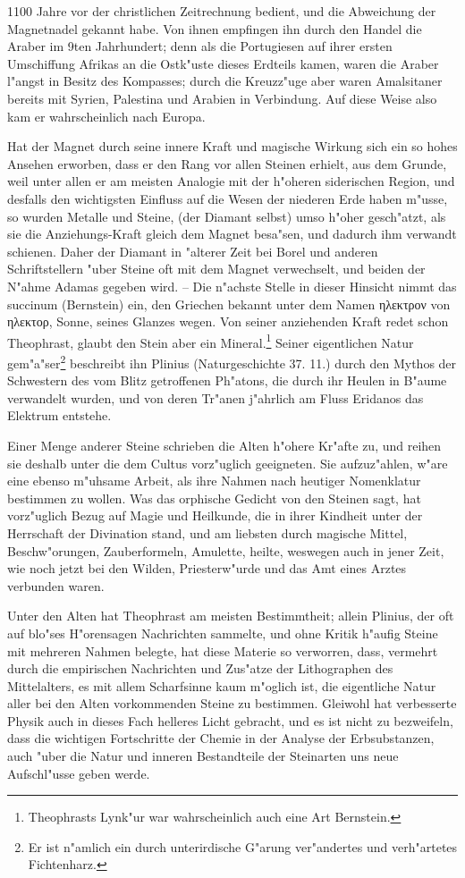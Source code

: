 \documentclass[a4paper, 11pt, oneside, polutonikogreek, german]{article}
\begin{document}
1100 Jahre vor der christlichen Zeitrechnung bedient, und die Abweichung der Magnetnadel gekannt habe. Von ihnen empfingen ihn durch den Handel die Araber im 9ten Jahrhundert; denn als die Portugiesen auf ihrer ersten Umschiffung Afrikas an die Ostk"uste dieses Erdteils kamen, waren die Araber l"angst in Besitz des Kompasses; durch die Kreuzz"uge aber waren Amalsitaner bereits mit Syrien, Palestina und Arabien in Verbindung. Auf diese Weise also kam er wahrscheinlich nach Europa.

Hat der Magnet durch seine innere Kraft und magische Wirkung sich ein so hohes Ansehen erworben, dass er den Rang vor allen Steinen erhielt, aus dem Grunde, weil unter allen er am meisten Analogie mit der h"oheren siderischen Region, und desfalls den wichtigsten Einfluss auf die Wesen der niederen Erde haben m"usse, so wurden Metalle und Steine, (der Diamant selbst) umso h"oher gesch"atzt, als sie die Anziehungs-Kraft gleich dem Magnet besa"sen, und dadurch ihm verwandt schienen. Daher der Diamant in "alterer Zeit bei Borel und anderen Schriftstellern "uber Steine oft mit dem Magnet verwechselt, und beiden der N"ahme Adamas gegeben wird. -- Die n"achste Stelle in dieser Hinsicht nimmt das succinum (Bernstein) ein, den Griechen bekannt unter dem Namen ηλεκτρον von ηλεκτορ, Sonne, seines Glanzes wegen. Von seiner anziehenden Kraft redet schon Theophrast, glaubt den Stein aber ein Mineral.\footnote{Theophrasts Lynk"ur war wahrscheinlich auch eine Art Bernstein.} Seiner eigentlichen Natur gem"a"ser\footnote{Er ist n"amlich ein durch unterirdische G"arung ver"andertes und verh"artetes Fichtenharz.} beschreibt ihn Plinius (Naturgeschichte 37. 11.) durch den Mythos der Schwestern des vom Blitz getroffenen Ph"atons, die durch ihr Heulen in B"aume verwandelt wurden, und von deren Tr"anen j"ahrlich am Fluss Eridanos das Elektrum entstehe.

Einer Menge anderer Steine schrieben die Alten h"ohere Kr"afte zu, und reihen sie deshalb unter die dem Cultus vorz"uglich geeigneten. Sie aufzuz"ahlen, w"are eine ebenso m"uhsame Arbeit, als ihre Nahmen nach heutiger Nomenklatur bestimmen zu wollen. Was das orphische Gedicht von den Steinen sagt, hat vorz"uglich Bezug auf Magie und Heilkunde, die in ihrer Kindheit unter der Herrschaft der Divination stand, und am liebsten durch magische Mittel, Beschw"orungen, Zauberformeln, Amulette, heilte, weswegen auch in jener Zeit, wie noch jetzt bei den Wilden, Priesterw"urde und das Amt eines Arztes verbunden waren.

Unter den Alten hat Theophrast am meisten Bestimmtheit; allein Plinius, der oft auf blo"ses H"orensagen Nachrichten sammelte, und ohne Kritik h"aufig Steine mit mehreren Nahmen belegte, hat diese Materie so verworren, dass, vermehrt durch die empirischen Nachrichten und Zus"atze der Lithographen des Mittelalters, es mit allem Scharfsinne kaum m"oglich ist, die eigentliche Natur aller bei den Alten vorkommenden Steine zu bestimmen. Gleiwohl hat verbesserte Physik auch in dieses Fach helleres Licht gebracht, und es ist nicht zu bezweifeln, dass die wichtigen Fortschritte der Chemie in der Analyse der Erbsubstanzen, auch "uber die Natur und inneren Bestandteile der Steinarten uns neue Aufschl"usse geben werde.
\end{document}
